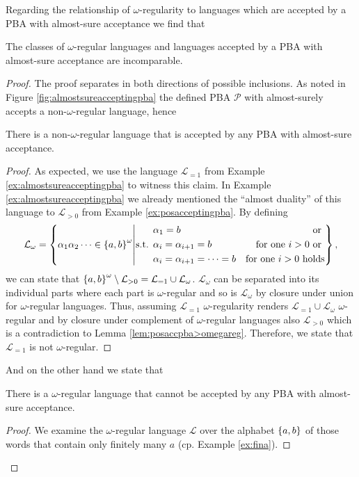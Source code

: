 Regarding the relationship of $\omega$-regularity to languages which are 
accepted by a \ac{PBA} with almost-sure acceptance we find that
\begin{theorem}
  \cite[Theorem 4, (b), (c)]{DecProblemsForProbAuto}
  The classes of $\omega$-regular languages and languages accepted by a 
  \ac{PBA} with almost-sure acceptance are incomparable.
\end{theorem}
\begin{proof}
  The proof separates in both directions of possible inclusions. As noted in
  Figure \ref{fig:almostsureacceptingpba} the defined \ac{PBA} $\mathcal{P}$
  with almost-surely accepts a non-$\omega$-regular language, hence
  \begin{lemma}
    There is a non-$\omega$-regular language that is accepted by any \ac{PBA} 
    with almost-sure acceptance.
  \end{lemma}
  \begin{proof}
    As expected, we use the language $\mathcal{L}_{=1}$ from Example 
    \ref{ex:almostsureacceptingpba} to witness this claim. In Example 
    \ref{ex:almostsureacceptingpba} we already mentioned the 
    \enquote{almost duality} of this language to $\mathcal{L}_{>0}$ from 
    Example \ref{ex:posacceptingpba}. By defining
    \begin{equation*}
      \mathcal{L}_{\omega} = \left\{
        \alpha_{1}\alpha_{2}\dots\in\left\{a,b\right\}^{\omega}\middle|
        \text{s.t. }
        \begin{aligned}
          &\alpha_{1} = b&\text{or }\\
          &\alpha_{i} = \alpha_{i+1} = b&\text{for one }i>0\text{ or }\\
          &\alpha_{i} = \alpha_{i+1} = \dots = b&\text{for one }i>0\text{ holds}
        \end{aligned}
      \right\},
    \end{equation*}
    we can state that 
    $\left\{a,b\right\}^{\omega}\setminus\mathcal{L}_{>0} = 
      \mathcal{L}_{=1}\cup\mathcal{L}_{\omega}$.
    $\mathcal{L}_{\omega}$ can be separated into its individual parts where 
    each part is $\omega$-regular and so is $\mathcal{L}_{\omega}$ by closure 
    under union for $\omega$-regular languages. Thus, assuming 
    $\mathcal{L}_{=1}$ $\omega$-regularity renders 
    $\mathcal{L}_{=1}\cup\mathcal{L}_{\omega}$ $\omega$-regular and by closure 
    under complement of $\omega$-regular languages also $\mathcal{L}_{>0}$ 
    which is a contradiction to Lemma \ref{lem:posaccpba>omegareg}. Therefore, 
    we state that $\mathcal{L}_{=1}$ is not $\omega$-regular.
  \end{proof}
  And on the other hand we state that
  \begin{lemma}
    There is a $\omega$-regular language that cannot be accepted by any 
    \ac{PBA} with almost-sure acceptance.
  \end{lemma}
  \begin{proof}
    We examine the $\omega$-regular language $\mathcal{L}$ over the alphabet
    $\left\{a,b\right\}$ of those words that contain only finitely many $a$ (cp. Example
    \ref{ex:fina}).
  \end{proof}
\end{proof}

